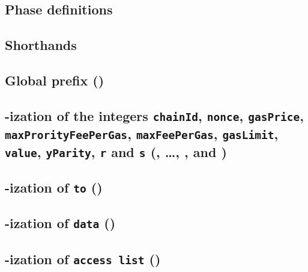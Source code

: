 \def\localSectionTitle {\rlp{}-ization of the integers \texttt{chainId}, \texttt{nonce}, \texttt{gasPrice}, \texttt{maxProrityFeePerGas}, \texttt{maxFeePerGas}, \texttt{gasLimit}, \texttt{value}, \texttt{yParity}, \texttt{r} and \texttt{s} }

\subsection{Phase definitions}                                                                    \label{rlp txn v2: phase constraints: definitions}    
\subsection{Shorthands}                                                                           \label{rlp txn v2: phase constraints: shorthands}     
\subsection{Global \rlp{} prefix (\phaseRlpPrefix)}                                               \label{rlp txn v2: phase constraints: rlp prefix}     
\subsection{\localSectionTitle{} (\phaseChainId{}, \dots, \phaseY{}, \phaseR{} and \phaseS{})}    \label{rlp txn v2: phase constraints: integers}       
\subsection{\rlp{}-ization of \texttt{to} (\phaseTo)}                                             \label{rlp txn v2: phase constraints: to address}         
\subsection{\rlp{}-ization of \texttt{data} (\phaseData)}                                         \label{rlp txn v2: phase constraints: payload}        
\subsection{\rlp{}-ization of \texttt{access list} (\phaseAccessList)}                            \label{rlp txn v2: phase constraints: access list}    
